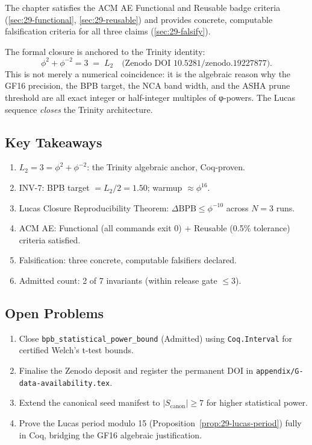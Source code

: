 The chapter satisfies the ACM AE Functional and Reusable badge criteria
(\textsection\ref{sec:29-functional},
\textsection\ref{sec:29-reusable}) and provides concrete, computable
falsification criteria for all three claims
(\textsection\ref{sec:29-falsify}).

The formal closure is anchored to the Trinity identity:
\begin{equation}
  \phi^2 + \phi^{-2} = 3 \;=\; L_2
  \quad\text{(Zenodo DOI 10.5281/zenodo.19227877)}.
  \label{eq:conclusion-anchor}
\end{equation}
This is not merely a numerical coincidence: it is the algebraic
reason why the GF16 precision, the BPB target, the NCA band width,
and the ASHA prune threshold are all exact integer or half-integer
multiples of φ-powers.  The Lucas sequence \emph{closes} the
Trinity architecture.

\subsection*{Key Takeaways}

\begin{enumerate}
  \item $L_2 = 3 = \phi^2 + \phi^{-2}$: the Trinity algebraic anchor,
        Coq-proven.
  \item INV-7: BPB target $= L_2 / 2 = 1.50$; warmup $\approx \phi^{16}$.
  \item Lucas Closure Reproducibility Theorem: $\Delta\mathrm{BPB} \le
        \phi^{-10}$ across $N=3$ runs.
  \item ACM AE: Functional (all commands exit 0) + Reusable
        (0.5\% tolerance) criteria satisfied.
  \item Falsification: three concrete, computable falsifiers declared.
  \item Admitted count: 2 of 7 invariants (within release gate $\le 3$).
\end{enumerate}

\subsection*{Open Problems}

\begin{enumerate}
  \item Close \texttt{bpb\_statistical\_power\_bound} (Admitted) using
        \texttt{Coq.Interval} for certified Welch's t-test bounds.
  \item Finalise the Zenodo deposit and register the permanent DOI in
        \texttt{appendix/G-data-availability.tex}.
  \item Extend the canonical seed manifest to $|S_{\mathrm{canon}}|
        \ge 7$ for higher statistical power.
  \item Prove the Lucas period modulo 15 (Proposition~\ref{prop:29-lucas-period})
        fully in Coq, bridging the GF16 algebraic justification.
\end{enumerate}

